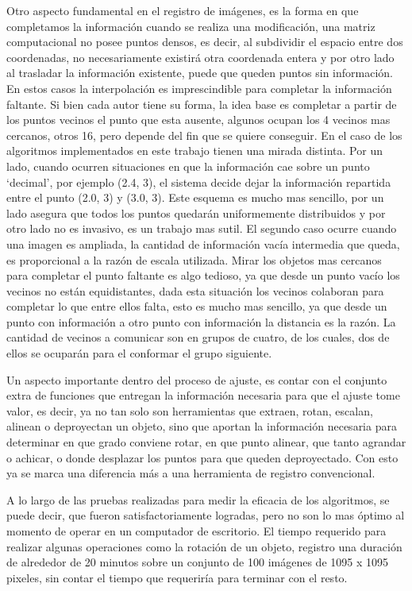 Otro aspecto fundamental en el registro de imágenes, es la forma en
que completamos la información cuando se realiza una modificación, una
matriz computacional no posee puntos densos, es decir, al subdividir
el espacio entre dos coordenadas, no necesariamente existirá otra
coordenada entera y por otro lado al trasladar la información
existente, puede que queden puntos sin información. En estos casos la
interpolación es imprescindible para completar la información
faltante. Si bien cada autor tiene su forma, la idea base es completar
a partir de los puntos vecinos el punto que esta ausente, algunos
ocupan los 4 vecinos mas cercanos, otros 16, pero depende del fin que
se quiere conseguir. En el caso de los algoritmos implementados en
este trabajo tienen una mirada distinta. Por un lado, cuando ocurren
situaciones en que la información cae sobre un punto ‘decimal’, por
ejemplo (2.4, 3), el sistema decide dejar la información repartida
entre el punto (2.0, 3) y (3.0, 3). Este esquema es mucho mas
sencillo, por un lado asegura que todos los puntos quedarán
uniformemente distribuidos y por otro lado no es invasivo, es un
trabajo mas sutil. El segundo caso ocurre cuando una imagen es
ampliada, la cantidad de información vacía intermedia que queda, es
proporcional a la razón de escala utilizada. Mirar los objetos mas
cercanos para completar el punto faltante es algo tedioso, ya que
desde un punto vacío los vecinos no están equidistantes, dada esta
situación los vecinos colaboran para completar lo que entre ellos
falta, esto es mucho mas sencillo, ya que desde un punto con
información a otro punto con información la distancia es la razón. La
cantidad de vecinos a comunicar son en grupos de cuatro, de los
cuales, dos de ellos se ocuparán para el conformar el grupo siguiente.

Un aspecto importante dentro del proceso de ajuste, es contar con el
conjunto extra de funciones que entregan la información necesaria para
que el ajuste tome valor, es decir, ya no tan solo son herramientas
que extraen, rotan, escalan, alinean o deproyectan un objeto, sino que
aportan la información necesaria para determinar en que grado conviene
rotar, en que punto alinear, que tanto agrandar o achicar, o donde
desplazar los puntos para que queden deproyectado. Con esto ya se
marca una diferencia más a una herramienta de registro convencional.

A lo largo de las pruebas realizadas para medir la eficacia de los
algoritmos, se puede decir, que fueron satisfactoriamente logradas,
pero no son lo mas óptimo al momento de operar en un computador de
escritorio. El tiempo requerido para realizar algunas operaciones como
la rotación de un objeto, registro una duración de alrededor de 20
minutos sobre un conjunto de 100 imágenes de 1095 x 1095 pixeles, sin
contar el tiempo que requeriría para terminar con el resto.

